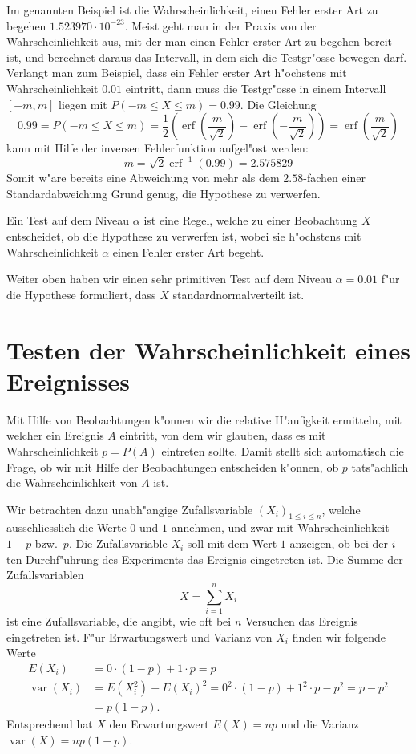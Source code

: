 Im genannten Beispiel ist die Wahrscheinlichkeit, einen Fehler erster
Art zu begehen $1.523970\cdot 10^{-23}$. Meist geht man in der Praxis von der
Wahrscheinlichkeit aus, mit der man einen Fehler erster Art zu begehen
bereit ist, und berechnet daraus das Intervall, in dem sich die
Testgr"osse bewegen darf. Verlangt man zum Beispiel, dass ein Fehler erster
Art h"ochstens mit Wahrscheinlichkeit $0.01$ eintritt, dann muss die 
Testgr"osse in einem Intervall $[-m,m]$ liegen mit $P(-m\le X\le m)=0.99$.
Die Gleichung
\[
0.99 = P(-m\le X\le m)
=\frac12\left(\operatorname{erf}(\frac{m}{\sqrt{2}})-\operatorname{erf}(-\frac{m}{\sqrt{2}})\right)
=\operatorname{erf}(\frac{m}{\sqrt{2}})
\]
kann mit Hilfe der inversen Fehlerfunktion aufgel"ost werden:
\[
m=\sqrt{2}\operatorname{erf}^{-1}(0.99)=2.575829
\]
Somit w"are bereits eine Abweichung von mehr als dem $2.58$-fachen einer
Standardabweichung Grund genug, die Hypothese zu verwerfen.

\begin{definition}
Ein Test auf dem Niveau $\alpha$ ist eine Regel, welche zu einer
Beobachtung $X$ entscheidet, ob die Hypothese zu verwerfen ist, wobei
sie h"ochstens mit Wahrscheinlichkeit $\alpha$ einen Fehler erster
Art begeht.
\end{definition}

Weiter oben haben wir einen sehr primitiven Test auf dem Niveau
$\alpha=0.01$ f"ur die
Hypothese formuliert, dass $X$ standardnormalverteilt ist.

\section{Testen der Wahrscheinlichkeit eines Ereignisses}
Mit Hilfe von Beobachtungen k"onnen wir die relative H"aufigkeit ermitteln, mit
welcher ein Ereignis $A$ eintritt, von dem wir glauben, dass es mit
Wahrscheinlichkeit $p=P(A)$ eintreten sollte.
Damit stellt sich automatisch die Frage, ob wir mit Hilfe der
Beobachtungen entscheiden k"onnen, ob $p$ tats"achlich die Wahrscheinlichkeit
von $A$ ist.

Wir betrachten dazu unabh"angige Zufallsvariable $(X_i)_{1\le i\le n}$,
welche ausschliesslich
die Werte $0$ und $1$ annehmen, und zwar mit Wahrscheinlichkeit
$1-p$ bzw.~$p$. Die Zufallsvariable $X_i$ soll mit dem Wert $1$ anzeigen,
ob bei der $i$-ten Durchf"uhrung des Experiments das Ereignis eingetreten ist.
Die Summe der Zufallsvariablen 
\[
X=\sum_{i=1}^nX_i
\]
ist eine Zufallsvariable, die angibt, wie oft bei $n$ Versuchen das Ereignis
eingetreten ist. F"ur Erwartungswert und Varianz von $X_i$ finden
wir folgende Werte
\begin{align*}
E(X_i)
&=
0\cdot (1-p)+1\cdot p=p
\\
\operatorname{var}(X_i)
&=
E(X_i^2)-E(X_i)^2=0^2\cdot (1-p)+1^2\cdot p-p^2 =p-p^2
\\
&=
p(1-p).
\end{align*}
Entsprechend hat $X$ den Erwartungswert $E(X)=np$ und
die Varianz $\operatorname{var}(X)=np(1-p)$.


